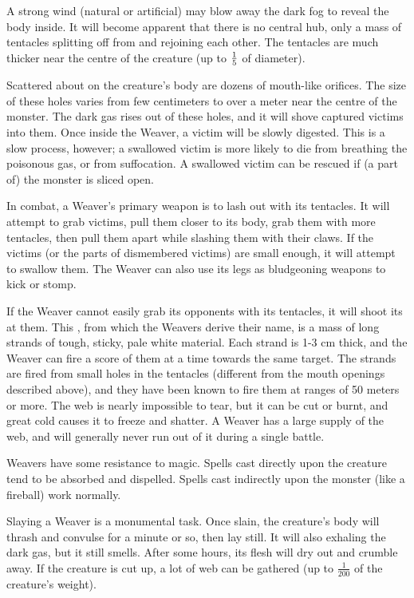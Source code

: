 A strong wind (natural or artificial) may blow away the dark fog to reveal the body inside. It will become apparent that there is no central hub, only a mass of tentacles splitting off from and rejoining each other. The tentacles are much thicker near the centre of the creature (up to $\textstyle{\frac{1}{5}}$ of diameter). 

Scattered about on the creature's body are dozens of mouth-like orifices. The size of these holes varies from few centimeters to over a meter near the centre of the monster. The dark gas rises out of these holes, and it will shove captured victims into them. Once inside the Weaver, a victim will be slowly digested. This is a slow process, however; a swallowed victim is more likely to die from breathing the poisonous gas, or from suffocation. A swallowed victim can be rescued if (a part of) the monster is sliced open. 

In combat, a Weaver's primary weapon is to lash out with its tentacles. It will attempt to grab victims, pull them closer to its body, grab them with more tentacles, then pull them apart while slashing them with their claws. If the victims (or the parts of dismembered victims) are small enough, it will attempt to swallow them. The Weaver can also use its legs as bludgeoning weapons to kick or stomp. 

If the Weaver cannot easily grab its opponents with its tentacles, it will shoot its  at them. This , from which the Weavers derive their name, is a mass of long strands of tough, sticky, pale white material. Each strand is 1-3 cm thick, and the Weaver can fire a score of them at a time towards the same target. The strands are fired from small holes in the tentacles (different from the mouth openings described above), and they have been known to fire them at ranges of 50 meters or more. The web is nearly impossible to tear, but it can be cut or burnt, and great cold causes it to freeze and shatter. A Weaver has a large supply of the web, and will generally never run out of it during a single battle. 

Weavers have some resistance to magic. Spells cast directly upon the creature tend to be absorbed and dispelled. Spells cast indirectly upon the monster (like a fireball) work normally. 

Slaying a Weaver is a monumental task. Once slain, the creature's body will thrash and convulse for a minute or so, then lay still. It will also exhaling the dark gas, but it still smells. After some hours, its flesh will dry out and crumble away. If the creature is cut up, a lot of web can be gathered (up to $\frac{1}{200}$ of the creature's weight). 









